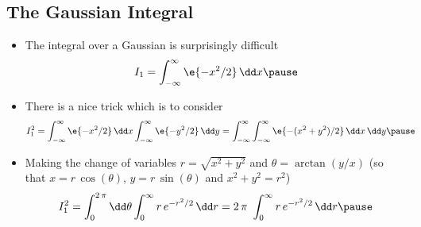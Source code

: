 \begin{slide}
\section[-2]{The Gaussian Integral}

\begin{PauseHighLight}\small\squeeze
  \begin{itemize}
  \item The integral over a Gaussian is surprisingly difficult
    \begin{align*}
        I_1 = \int_{-\infty}^{\infty} \e{-x^2/2} \, \dd x\pause
    \end{align*}
  \item There is a nice trick which is to consider
    \begin{align*}
        I_1^2 &=  \int_{-\infty}^{\infty} \e{-x^2/2} \, \dd x
                \int_{-\infty}^{\infty} \e{-y^2/2} \, \dd y
                =   \int_{-\infty}^{\infty}  \int_{-\infty}^{\infty}
                  \e{-(x^2+y^2)/2} \, \dd x \, \dd y\pause
      \end{align*}
    \item Making the change of variables $r
      = \sqrt{x^2 + y^2}$ and $\theta = \arctan(y/x)$  (so that
      $x=r\,\cos(\theta)$, $y=r\,\sin(\theta)$ and $x^2+y^2=r^2$)
      \begin{align*}
        I_1^2 = \int_0^{2\,\pi} \dd \theta \int_{0}^\infty r\,e^{-r^2/2} \, \dd r
        = 2\,\pi \ \int_{0}^\infty r\,e^{-r^2/2} \, \dd r \pause
      \end{align*}
  \end{itemize}
\end{PauseHighLight}

\end{slide}



